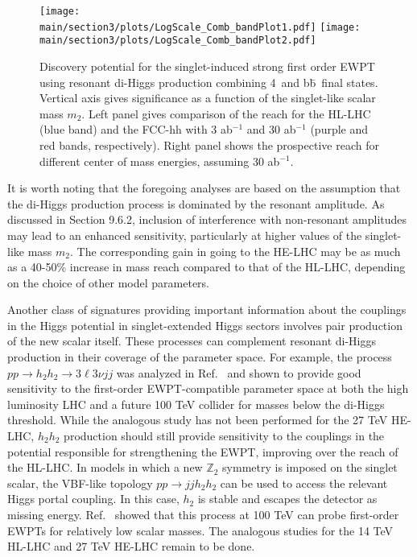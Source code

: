 \begin{figure}[hbtp]
  \begin{center}
    \texttt{[image: \\main/section3/plots/LogScale\_Comb\_bandPlot1.pdf]}
    \texttt{[image: \\main/section3/plots/LogScale\_Comb\_bandPlot2.pdf]}
    \caption{
    Discovery potential for the singlet-induced strong first order EWPT using resonant di-Higgs production combining 4\texttau\ and b\={b}\textgamma\textgamma\ final states\cite{Kotwal:2016tex}. Vertical axis gives significance as a function of the singlet-like scalar mass $m_2$. Left panel gives comparison of the reach for the HL-LHC (blue band) and the FCC-hh with 3 ab$^{-1}$ and 30 ab$^{-1}$ (purple and red bands, respectively). Right panel shows the prospective reach for different center of mass energies, assuming 30 ab$^{-1}$.    
        }
    \label{fig:ewpt_resdihiggs}
  \end{center}
\end{figure}

It is worth noting that the foregoing analyses are based on the assumption that the di-Higgs production process is dominated by the resonant amplitude. As discussed in Section 9.6.2, inclusion of interference with non-resonant amplitudes may lead to an enhanced sensitivity, particularly at higher values of the singlet-like mass $m_2$. The corresponding gain in going to the HE-LHC may be as much as a 40-50\% increase in mass reach compared to that of the HL-LHC, depending on the choice of other model parameters.

Another class of signatures providing important information about the couplings in the Higgs potential in singlet-extended Higgs sectors involves pair production of the new scalar itself. These processes can complement resonant di-Higgs production in their coverage of the parameter space. For example, the process $p p\rightarrow h_2 h_2 \rightarrow 3\ell 3\nu j j$ was analyzed in Ref.~\cite{Chen:2017qcz} and shown to provide good sensitivity to the first-order EWPT-compatible parameter space at both the high luminosity LHC and a future 100 TeV collider for masses below the di-Higgs threshold. While the analogous study has not been performed for the 27 TeV HE-LHC, $h_2 h_2$ production should still provide sensitivity to the couplings in the potential responsible for strengthening the EWPT, improving over the reach of the HL-LHC. In models in which a new $\mathbb{Z}_2$ symmetry is imposed on the singlet scalar, the VBF-like topology $p p \rightarrow j j h_2 h_2$ can be used to access the relevant Higgs portal coupling. In this case, $h_2$ is stable and escapes the detector as missing energy. Ref.~\cite{Curtin:2014jma} showed that this process at 100 TeV can probe first-order EWPTs for relatively low scalar masses. The analogous studies for the 14 TeV HL-LHC and 27 TeV HE-LHC remain to be done. 

